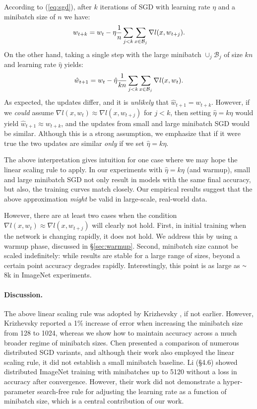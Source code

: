 \documentclass[10pt,twocolumn,letterpaper]{article}
\def\B{\mathcal{B}}
\newcommand{\app}{\raise.17ex\hbox{$\scriptstyle\sim$}}
\newcommand{\eqntight}[2]{\vspace{-1mm}\begin{equation}\label{eq:#1}#2\vspace{-1mm}\end{equation}\ignorespaces}
\begin{document}
According to (\ref{eq:sgd}), after $k$ iterations of SGD with learning rate $\eta$ and a minibatch size of $n$ we have:
 \eqntight{sgd_kxn}{ w_{t+k} = w_t - \eta \frac{1}{n} \sum_{j<k} \sum_{x\in\B_j} \nabla l(x,w_{t+j}). }
On the other hand, taking a single step with the large minibatch $\cup_j \B_j$ of size $kn$ and learning rate $\hat\eta$ yields:
 \eqntight{sgd_kn}{ \hat w_{t+1} = w_t -  \hat\eta \frac{1}{kn} \sum_{j<k} \sum_{x\in\B_j} \nabla l(x,w_t). }
As expected, the updates differ, and it is \emph{unlikely} that $\hat w_{t+1} = w_{t+k}$. However, if we \emph{could} assume $\nabla l(x,w_t) \approx \nabla l(x,w_{t+j})$ for $j<k$, then setting $\hat\eta=k\eta$ would yield $\hat w_{t+1} \approx w_{t+k}$, and the updates from small and large minibatch SGD would be similar. Although this is a strong assumption, we emphasize that if it were true the two updates are similar \emph{only} if we set $\hat\eta=k\eta$.

The above interpretation gives intuition for one case where we may hope the linear scaling rule to apply. In our experiments with $\hat \eta = k \eta$ (and warmup), small and large minibatch SGD not only result in models with the same final accuracy, but also, the training curves match closely. Our empirical results suggest that the above approximation \emph{might} be valid in large-scale, real-world data.

However, there are at least two cases when the condition $\nabla l(x,w_t) \approx \nabla l(x,w_{t+j})$ will clearly not hold. First, in initial training when the network is changing rapidly, it does not hold. We address this by using a warmup phase, discussed in \S\ref{sec:warmup}. Second, minibatch size cannot be scaled indefinitely: while results are stable for a large range of sizes, beyond a certain point accuracy degrades rapidly. Interestingly, this point is as large as $\app$8k in ImageNet experiments.

\paragraph{Discussion.} The above linear scaling rule was adopted by Krizhevsky \cite{Krizhevsky2014}, if not earlier. However, Krizhevsky reported a 1\% increase of error when increasing the minibatch size from 128 to 1024, whereas we show how to maintain accuracy across a much broader regime of minibatch sizes. Chen \etal  \cite{Chen2016} presented a comparison of numerous distributed SGD variants, and although their work also employed the linear scaling rule, it did not establish a small minibatch baseline. Li \cite{MuLiPhDThesis2017} (\S4.6) showed distributed ImageNet training with minibatches up to 5120 without a loss in accuracy after convergence. However, their work did not demonstrate a hyper-parameter search-free rule for adjusting the learning rate as a function of minibatch size, which is a central contribution of our work.
\end{document}
